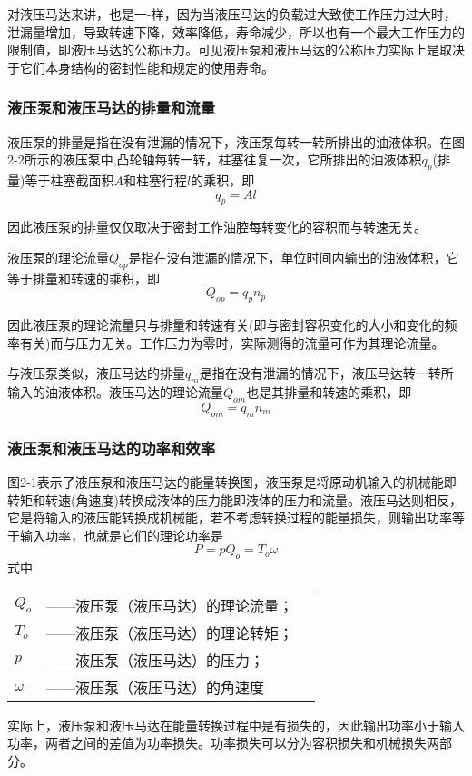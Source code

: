 
对液压马达来讲，也是一-样，因为当液压马达的负载过大致使工作压力过大时，泄漏量增加，导致转速下降，效率降低，寿命减少，所以也有一个最大工作压力的限制值，即液压马达的公称压力。可见液压泵和液压马达的公称压力实际上是取决于它们本身结构的密封性能和规定的使用寿命。
\subsubsection{液压泵和液压马达的排量和流量}
液压泵的排量是指在没有泄漏的情况下，液压泵每转一转所排出的油液体积。在图2-2所示的液压泵中,凸轮轴每转一转，柱塞往复一次，它所排出的油液体积$q_{p}$(排量)等于柱塞截面积$A$和柱塞行程$l$的乘积，即
\begin{equation}
  q_{p}={A}{l}
\end{equation}

因此液压泵的排量仅仅取决于密封工作油腔每转变化的容积而与转速无关。

液压泵的理论流量$Q_{op}$是指在没有泄漏的情况下，单位时间内输出的油液体积，它等于排量和转速的乘积，即
\begin{equation}
  Q_{op}={q_{p}}{n_{p}}
\end{equation}

因此液压泵的理论流量只与排量和转速有关(即与密封容积变化的大小和变化的频率有关)而与压力无关。工作压力为零时，实际测得的流量可作为其理论流量。

与液压泵类似，液压马达的排量$q_{m}$是指在没有泄漏的情况下，液压马达转一转所输入的油液体积。液压马达的理论流量$Q_{om}$也是其排量和转速的乘积，即
\begin{equation}
  Q_{om}={q_{m}}{n_{m}}
\end{equation}

\subsubsection{液压泵和液压马达的功率和效率}
图2-1表示了液压泵和液压马达的能量转换图，液压泵是将原动机输入的机械能即转矩和转速(角速度)转换成液体的压力能即液体的压力和流量。液压马达则相反，它是将输入的液压能转换成机械能，若不考虑转换过程的能量损失，则输出功率等于输入功率，也就是它们的理论功率是
\begin{equation}
  P={p}{Q_{o}}={T_{o}}{\omega }
\end{equation}
\noindent 式中\
\begin{tabular}[t]{lll}
  $Q_{o}$ &——液压泵（液压马达）的理论流量；\\
  $T_{o}$ &——液压泵（液压马达）的理论转矩；\\
  $p$ &——液压泵（液压马达）的压力；\\
  $\omega$ &——液压泵（液压马达）的角速度
  \end{tabular}
实际上，液压泵和液压马达在能量转换过程中是有损失的，因此输出功率小于输入功率，两者之间的差值为功率损失。功率损失可以分为容积损失和机械损失两部分。

